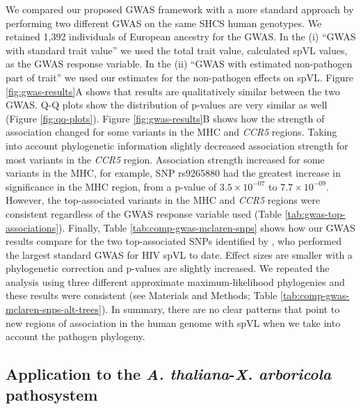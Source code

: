 \documentclass[11pt]{article}
\begin{document}
\begin{linenumbers}
We compared our proposed GWAS framework with a more standard approach by performing two different GWAS on the same SHCS human genotypes. We retained 1,392 individuals of European ancestry for the GWAS. In the (i) ``GWAS with standard trait value'' we used the total trait value, calculated spVL values, as the GWAS response variable. In the (ii) ``GWAS with estimated non-pathogen part of trait'' we used our estimates for the non-pathogen effects on spVL. Figure \ref{fig:gwas-results}A shows that results are qualitatively similar between the two GWAS. Q-Q plots show the distribution of p-values are very similar as well (Figure \ref{fig:qq-plots}). Figure \ref{fig:gwas-results}B shows how the strength of association changed for some variants in the MHC and \emph{CCR5} regions. Taking into account phylogenetic information slightly decreased association strength for most variants in the \emph{CCR5} region. Association strength increased for some variants in the MHC, for example, SNP rs9265880 had the greatest increase in significance in the MHC region, from a p-value of $3.5 \times 10^{-07}$ to $7.7 \times 10^{-09}$. However, the top-associated variants in the MHC and \emph{CCR5} regions were consistent regardless of the GWAS response variable used (Table \ref{tab:gwas-top-associations}). Finally, Table \ref{tab:comp-gwas-mclaren-snps} shows how our GWAS results compare for the two top-associated SNPs identified by \citet{McLaren2015}, who performed the largest standard GWAS for HIV spVL to date. Effect sizes are smaller with a phylogenetic correction and p-values are slightly increased. We repeated the analysis using three different approximate maximum-likelihood phylogenies and these results were consistent (see Materials and Methods; Table \ref{tab:comp-gwas-mclaren-snps-alt-trees}). In summary, there are no clear patterns that point to new regions of association in the human genome with spVL when we take into account the pathogen phylogeny.



\subsection*{Application to the \emph{A. thaliana}-\emph{X. arboricola} pathosystem}


\end{linenumbers}
\end{document}
